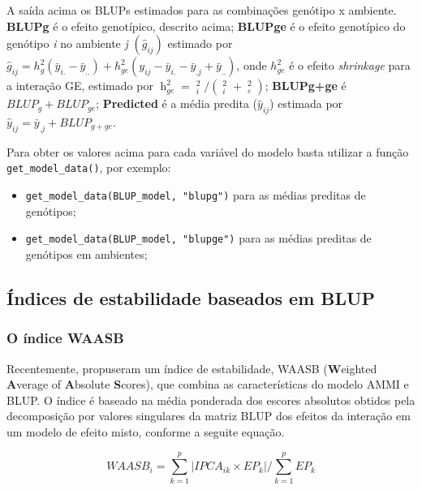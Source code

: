\documentclass[
]{book}
\providecommand{\tightlist}{%
  \setlength{\itemsep}{0pt}\setlength{\parskip}{0pt}}
\begin{document}
A saída acima os BLUPs  estimados para as combinações genótipo x ambiente. \textbf{BLUPg} é o efeito genotípico, descrito acima; \textbf{BLUPge} é o efeito genotípico do genótipo \emph{i} no ambiente \emph{j} \((\hat{g}_{ij})\) estimado por \(\hat{g}_{ij} = h_g^2(\bar{y}_{i.}-\bar{y}_{..})+h_{ge}^2(y_{ij}-\bar{y}_{i.}-\bar{y}_{.j}+\bar{y}_{..})\), onde \(h_{ge}^2\) é o efeito \emph{shrinkage} para a interação GE, estimado por \(\mathop h\nolimits_{ge}^2 = \mathop {\hat \sigma }\nolimits_i^2 /(\mathop {\hat \sigma }\nolimits_i^2 + \mathop {\hat \sigma }\nolimits_\varepsilon ^2)\); \textbf{BLUPg+ge} é \(BLUP_g+BLUP_{ge}\); \textbf{Predicted} é a média predita (\(\hat{y}_{ij}\)) estimada por \(\hat{y}_{ij} = \bar{y}_{.j}+BLUP_{g+ge}\).

Para obter os valores acima para cada variável do modelo basta utilizar a função \texttt{get\_model\_data()}, por exemplo:

\begin{itemize}
\tightlist
\item
  \texttt{get\_model\_data(BLUP\_model,\ "blupg")} para as médias preditas de genótipos;
\item
  \texttt{get\_model\_data(BLUP\_model,\ "blupge")} para as médias preditas de genótipos em ambientes;
\end{itemize}

\hypertarget{uxedndices-de-estabilidade-baseados-em-blup}{%
\subsection{Índices de estabilidade baseados em BLUP}\label{uxedndices-de-estabilidade-baseados-em-blup}}

\hypertarget{wsb}{%
\subsubsection{O índice WAASB}\label{wsb}}

Recentemente, \citep{Olivoto2019} propuseram um índice de estabilidade, WAASB (\textbf{W}eighted \textbf{A}verage of \textbf{A}bsolute \textbf{S}cores), que combina as características do modelo AMMI e BLUP. O índice é baseado na média ponderada dos escores absolutos obtidos pela decomposição por valores singulares da matriz BLUP dos efeitos da interação em um modelo de efeito misto, conforme a seguite equação.

\[
        WAASB_i  =
        \sum_{k = 1}^{p} |IPCA_{ik} \times EP_k|/ \sum_{k = 1}^{p}EP_k
\]
\end{document}

